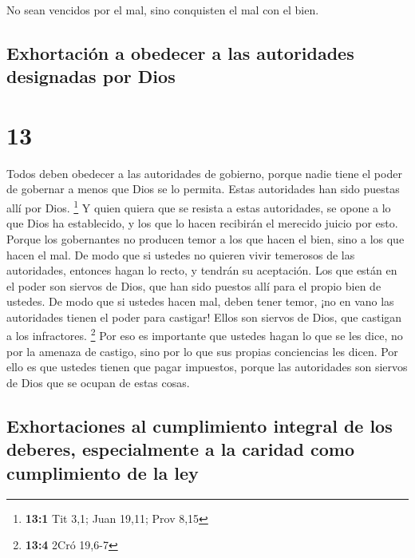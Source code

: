  No sean vencidos por el mal, sino conquisten el mal con
el bien.

\hypertarget{exhortaciuxf3n-a-obedecer-a-las-autoridades-designadas-por-dios}{%
\subsection{Exhortación a obedecer a las autoridades designadas por
Dios}\label{exhortaciuxf3n-a-obedecer-a-las-autoridades-designadas-por-dios}}

\hypertarget{section-12}{%
\section{13}\label{section-12}}

 Todos deben obedecer a las autoridades de gobierno,
porque nadie tiene el poder de gobernar a menos que Dios se lo permita.
Estas autoridades han sido puestas allí por Dios. \footnote{\textbf{13:1}
  Tit 3,1; Juan 19,11; Prov 8,15}  Y quien quiera que se
resista a estas autoridades, se opone a lo que Dios ha establecido, y
los que lo hacen recibirán el merecido juicio por esto. 
Porque los gobernantes no producen temor a los que hacen el bien, sino a
los que hacen el mal. De modo que si ustedes no quieren vivir temerosos
de las autoridades, entonces hagan lo recto, y tendrán su aceptación.
 Los que están en el poder son siervos de Dios, que han
sido puestos allí para el propio bien de ustedes. De modo que si ustedes
hacen mal, deben tener temor, ¡no en vano las autoridades tienen el
poder para castigar! Ellos son siervos de Dios, que castigan a los
infractores. \footnote{\textbf{13:4} 2Cró 19,6-7}  Por eso
es importante que ustedes hagan lo que se les dice, no por la amenaza de
castigo, sino por lo que sus propias conciencias les dicen.
 Por ello es que ustedes tienen que pagar impuestos,
porque las autoridades son siervos de Dios que se ocupan de estas cosas.

\hypertarget{exhortaciones-al-cumplimiento-integral-de-los-deberes-especialmente-a-la-caridad-como-cumplimiento-de-la-ley}{%
\subsection{Exhortaciones al cumplimiento integral de los deberes,
especialmente a la caridad como cumplimiento de la
ley}\label{exhortaciones-al-cumplimiento-integral-de-los-deberes-especialmente-a-la-caridad-como-cumplimiento-de-la-ley}}

